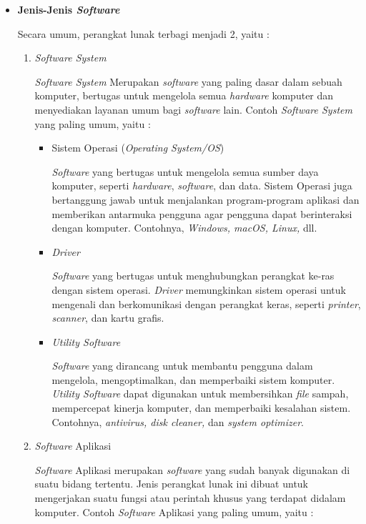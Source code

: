 \documentclass[12pt]{article}
\begin{document}
\begin{itemize}
        \item \textbf{Jenis-Jenis \textit{Software}}
        \par
        Secara umum, perangkat lunak terbagi menjadi 2, yaitu :
        \begin{enumerate}
            \item \textit{Software System}
            \par
            \textit{Software System} Merupakan \textit{software} yang paling dasar dalam sebuah komputer, bertugas untuk mengelola semua \textit{hardware} komputer dan menyediakan layanan umum bagi \textit{software} lain.\cite{Gramedia} Contoh \textit{Software System} yang paling umum, yaitu :
            \begin{itemize}
                \item Sistem Operasi (\textit{Operating System/OS})
                \par
                \textit{Software} yang bertugas untuk mengelola semua sumber daya komputer, seperti \textit{hardware}, \textit{software}, dan data. Sistem Operasi juga bertanggung jawab untuk menjalankan program-program aplikasi dan memberikan antarmuka pengguna agar pengguna dapat berinteraksi dengan komputer. Contohnya, \textit{Windows, macOS, Linux,} dll.
                \item \textit{Driver}
                \par 
                \textit{Software} yang bertugas untuk menghubungkan perangkat ke-ras dengan sistem operasi. 
                \textit{Driver} memungkinkan sistem operasi untuk mengenali dan berkomunikasi dengan perangkat keras, seperti \textit{printer}, \textit{scanner}, dan kartu grafis.
                \item \textit{Utility Software}
                \par
                \textit{Software} yang dirancang untuk membantu pengguna dalam mengelola, mengoptimalkan, dan memperbaiki sistem komputer. \textit{Utility Software} dapat digunakan untuk membersihkan \textit{file} sampah, mempercepat kinerja komputer, dan memperbaiki kesalahan sistem. Contohnya, \textit{antivirus, disk cleaner,} dan \textit{system optimizer}.
            \end{itemize} 
            \item \textit{Software} Aplikasi
            \par
            \textit{Software} Aplikasi merupakan \textit{software} yang sudah banyak digunakan di suatu bidang tertentu. Jenis perangkat lunak ini dibuat untuk mengerjakan suatu fungsi atau perintah khusus yang terdapat didalam komputer.\cite{Gramedia} Contoh \textit{Software} Aplikasi yang paling umum, yaitu :

\end{enumerate}
\end{itemize}
\end{document}
